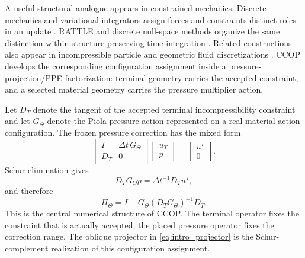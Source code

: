 \documentclass[11pt]{article}
\theoremstyle{plain}
\theoremstyle{definition}
\theoremstyle{remark}
\begin{document}
A useful structural analogue appears in constrained mechanics. Discrete mechanics and variational integrators assign forces and constraints distinct roles in an update \cite{MarsdenWest2001}. RATTLE and discrete null-space methods organize the same distinction within structure-preserving time integration \cite{Andersen1983,Betsch2005}. Related constructions also appear in incompressible particle and geometric fluid discretizations \cite{SuzukiKoshizukaOka2007,PavlovEtAl2011,GawlikEtAl2011}. CCOP develops the corresponding configuration assignment inside a pressure-projection/PPE factorization: terminal geometry carries the accepted constraint, and a selected material geometry carries the pressure multiplier action.

Let $D_T$ denote the tangent of the accepted terminal incompressibility
constraint and let $G_\Theta$ denote the Piola pressure action represented on a
real material action configuration.  The frozen pressure correction has the
mixed form
\begin{equation}
 \begin{bmatrix}
   I & \Delta t\,G_\Theta\\
   D_T & 0
 \end{bmatrix}
 \begin{bmatrix}u_T\\ p\end{bmatrix}
 =
 \begin{bmatrix}u^\star\\0\end{bmatrix}.
 \label{eq:intro_saddle_factorization}
\end{equation}
Schur elimination gives
\begin{equation}
 D_TG_\Theta p=\Delta t^{-1}D_Tu^\star,
 \label{eq:intro_cross_response}
\end{equation}
and therefore
\begin{equation}
 \Pi_\Theta=I-G_\Theta(D_TG_\Theta)^{-1}D_T.
 \label{eq:intro_projector}
\end{equation}
This is the central numerical structure of CCOP.  The terminal operator fixes
the constraint that is actually accepted; the placed pressure operator fixes
the correction range.  The oblique projector in
\eqref{eq:intro_projector} is the Schur-complement realization of this
configuration assignment.
\end{document}
